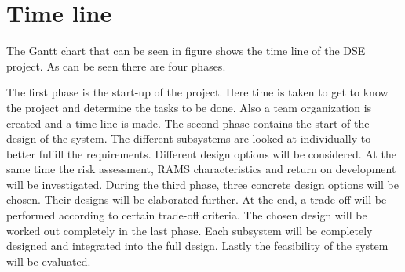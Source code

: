 \section{Time line}
\label{dsePPTimeline}
The Gantt chart that can be seen in figure %
shows the time line of the DSE project.
As can be seen there are four phases. 

The first phase is the start-up of the project. Here time is taken to get to know the project and
determine the tasks to be done. Also a team organization is created and a time line is made.
The second phase contains the start of the design of the system. The different subsystems are looked 
at individually to better fulfill the requirements. Different design options will be considered.
At the same time the risk assessment, RAMS characteristics and return on development will be investigated.
During the third phase, three concrete design options will be chosen. Their designs will be elaborated further.
At the end, a trade-off will be performed according to certain trade-off criteria.
The chosen design will be worked out completely in the last phase. Each subsystem will be completely designed
and integrated into the full design. Lastly the feasibility of the system will be evaluated.